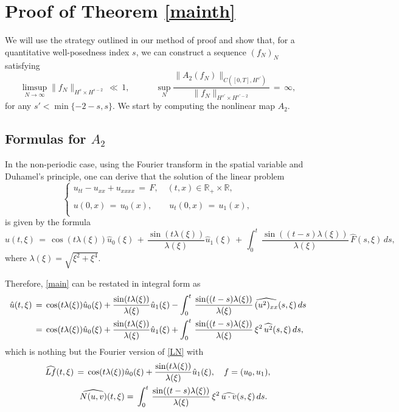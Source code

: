 \documentclass{amsart}
\begin{document}
\section{Proof of Theorem \ref{mainth}}
We will use the strategy outlined in our method of proof and show that, for a quantitative well-posedness  index $s$, we can construct a sequence $(f_N)_N$ satisfying
\[
\limsup_{N\to \infty} \|f_N\|_{H^s \times H^{s-2}}\,\ll\,1, \qquad \quad \sup_N \frac{\|A_2(f_N)\|_{C([0,T],H^{s'})}}{\|f_N\|_{H^{s'} \times H^{s'-2}}}\,=\,\infty,\]
for any $s'< \min\{-2-s, s\}$. We start by computing the nonlinear map $A_2$.


\subsection{Formulas for $A_2$} In the non-periodic case, using the Fourier transform in the spatial variable and Duhamel's principle, one can derive that the solution of the linear problem
\begin{equation}
\left\{
\begin{array}{l}
u_{tt}-u_{xx}+u_{xxxx}\,=\,F, \quad (t,x)\in \mathbb{R}_+\times\mathbb{R},\\
\\
u(0,x)\,=\,u_0(x),\qquad u_t(0,x)\,=\,u_1(x),\\
\end{array}\right.
\label{hom}
\end{equation}
is given by the formula
\begin{equation}
\hat{u}(t,\xi)\,=\,\cos(t \lambda(\xi)) \hat{u}_0(\xi)\,+\,\frac{\sin(t \lambda(\xi))}{\lambda(\xi)} \hat{u}_1(\xi)\,+\,\int_0^t\,\frac{\sin((t-s) \lambda(\xi))}{\lambda(\xi)} \,\hat{F}(s,\xi)\,ds,
\label{lin}\end{equation}
where $\lambda(\xi)=\sqrt{\xi^2+\xi^4}$. 

Therefore, \eqref{main} can be restated in integral form as
\begin{equation}
\aligned
\hat{u}(t,\xi)\,&=\,\cos(t \lambda(\xi)) \hat{u}_0(\xi)+\frac{\sin(t \lambda(\xi))}{\lambda(\xi)} \hat{u}_1(\xi)-\int_0^t\,\frac{\sin((t-s) \lambda(\xi))}{\lambda(\xi)} \,\widehat{(u^2)_{xx}}(s,\xi)\,ds\\
&=\,\cos(t \lambda(\xi)) \hat{u}_0(\xi)+\frac{\sin(t \lambda(\xi))}{\lambda(\xi)} \hat{u}_1(\xi)+\int_0^t\,\frac{\sin((t-s) \lambda(\xi))}{\lambda(\xi)}\, \xi^2\, \widehat{u^2}(s,\xi)\,ds,\endaligned
\label{mainf}
\end{equation}
which is nothing but the Fourier version of \eqref{LN} with
\begin{equation}
\aligned
\widehat{Lf}(t,\xi)\,=\,\cos(t \lambda(\xi))& \hat{u}_0(\xi)+\frac{\sin(t \lambda(\xi))}{\lambda(\xi)} \hat{u}_1(\xi),\quad f=(u_0,u_1),\\
\widehat{N(u,v)}(t,\xi)&=\,\int_0^t\,\frac{\sin((t-s) \lambda(\xi))}{\lambda(\xi)}\, \xi^2\, \widehat{u\cdot v}(s,\xi)\,ds.\endaligned
\label{lnf}
\end{equation}
\end{document}
